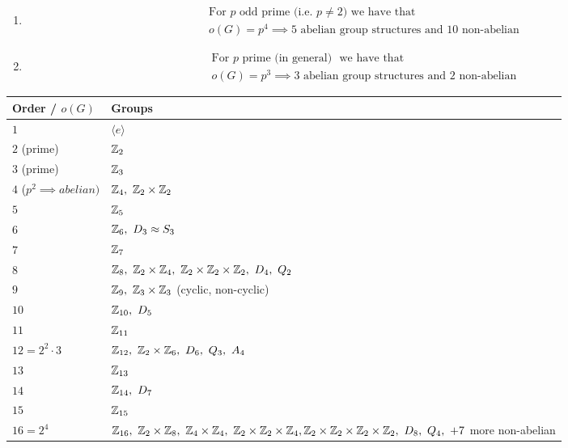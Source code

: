\begin{enumerate}
    \item \begin{align}
    \text{For }p \text{ odd prime (i.e. }p\neq 2) \text{ we have that } \nonumber \\
    o(G)=p^4 \implies 5 \text{ abelian group structures and } 10 \text{ non-abelian} \nonumber
\end{align}
\item \begin{align}
    \text{For }p \text{ prime (in general) } \text{ we have that } \nonumber \\
    o(G)=p^3 \implies 3 \text{ abelian group structures and } 2 \text{ non-abelian} \nonumber
\end{align}
\end{enumerate}
\newpage
\begin{table}[ht!]
    \centering
    \begin{tabular}{|l|p{}|} \hline
         \textbf{Order / }$o(G)$ & \textbf{Groups}  \\ \hline
         $1$ & $\langle e \rangle$ \\ \hline
         $2$ (prime) & ${\mathbb{Z}}_2$ \\  \hline
         $3$ (prime) & ${\mathbb{Z}}_3$ \\ \hline
         $4$ ($p^2\implies abelian)$ & $\Z_4 , \ \Z_2\times \Z_2$ \\ \hline
         $5$ & ${\mathbb{Z}}_5$ \\ \hline
         $6$ & $\Z_6,\ D_3\approx S_3$ \\ \hline
         $7$ & ${\mathbb{Z}}_7$ \\ \hline
         $8$ & $\Z_8, \ \Z_2\times \Z_4,  \ \Z_2\times \Z_2\times \Z_2, \ D_4, \ Q_2$ \\ \hline
         $9$ & $\Z_9, \ \Z_3\times \Z_3$ (cyclic, non-cyclic)\\ \hline
         $10$ & $\Z_{10}, \ D_5$ \\ \hline
         $11$ & ${\mathbb{Z}}_{11}$ \\ \hline
         $12=2^2\cdot 3$ & $\Z_{12}, \ \Z_2\times \Z_6, \ D_6, \ Q_3, \ A_4$ \\ \hline
         $13$ & ${\mathbb{Z}}_{13}$ \\ \hline
         $14$ & $\Z_{14}, \ D_7$ \\ \hline
         $15$ & ${\mathbb{Z}}_{15}$ \\ \hline
         $16=2^4$ & $\Z_{16}, \ \Z_2\times \Z_8,\ \Z_4\times \Z_4, \ \Z_2\times \Z_2\times \Z_4, \ \newline \Z_2\times \Z_2\times \Z_2\times \Z_2, \ D_8, \ Q_4, \ + 7$ more non-abelian \\  \hline

\end{tabular}
\end{table}
